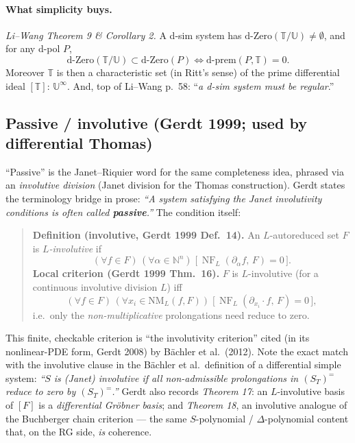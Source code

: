 \documentclass[11pt]{article}
\newcommand{\sat}[2]{[#1]\!:\!#2^{\infty}}
\newcommand{\NF}{\operatorname{NF}}
\newcommand{\dZero}{\mathrm{d\text{-}Zero}}
\newcommand{\dprem}{\mathrm{d\text{-}prem}}
\newcommand{\TT}{\mathbb{T}}
\newcommand{\UU}{\mathbb{U}}
\begin{document}
\paragraph{What simplicity buys.} \emph{Li--Wang Theorem 9 \& Corollary 2.} A
d-sim system has $\dZero(\TT/\UU)\ne\emptyset$, and for any d-pol $P$,
\[
  \dZero(\TT/\UU)\subset\dZero(P)\iff\dprem(P,\TT)=0 .
\]
Moreover $\TT$ is then a characteristic set (in Ritt's sense) of the prime
differential ideal $\sat{\TT}{\,\UU}$. And, top of Li--Wang p.~58: ``\emph{a
d-sim system must be regular}.''

\subsection{Passive / involutive (Gerdt 1999; used by differential Thomas)}

``Passive'' is the Janet--Riquier word for the same completeness idea, phrased
via an \emph{involutive division} (Janet division for the Thomas construction).
Gerdt states the terminology bridge in prose: \emph{``A system satisfying the
Janet involutivity conditions is often called \textbf{passive}.''} The condition
itself:

\begin{quote}
\textbf{Definition (involutive, Gerdt 1999 Def.~14).} An $L$-autoreduced set $F$
is \emph{$L$-involutive} if
\[
  (\forall f\in F)\,(\forall\alpha\in\mathbb{N}^n)\;
  \bigl[\,\NF_L(\partial_\alpha f,\,F)=0\,\bigr].
\]
\textbf{Local criterion (Gerdt 1999 Thm.~16).} $F$ is $L$-involutive
(for a continuous involutive division $L$) iff
\[
  (\forall f\in F)\,(\forall x_i\in\mathrm{NM}_L(f,F))\;
  \bigl[\,\NF_L(\partial_{x_i}\!\cdot f,\,F)=0\,\bigr],
\]
i.e.\ only the \emph{non-multiplicative} prolongations need reduce to zero.
\end{quote}

This finite, checkable criterion is ``the involutivity criterion'' cited (in its
nonlinear-PDE form, Gerdt 2008) by B\"achler et al.\ (2012). Note the exact
match with the involutive clause in the B\"achler et al.\ definition of a
differential simple system: \emph{``$S$ is (Janet) involutive if all
non-admissible prolongations in $(S_T)^=$ reduce to zero by $(S_T)^=$.''} Gerdt
also records \emph{Theorem 17}: an $L$-involutive basis of $[F]$ is a
\emph{differential Gr\"obner basis}; and \emph{Theorem 18}, an involutive
analogue of the Buchberger chain criterion --- the same $S$-polynomial /
$\Delta$-polynomial content that, on the RG side, \emph{is} coherence.
\end{document}
